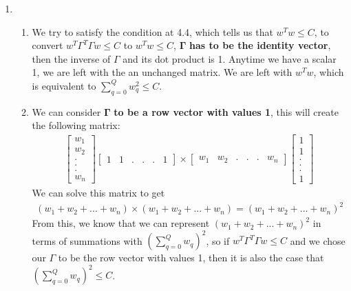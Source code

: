 \documentclass{article}
\begin{document}
\begin{enumerate}
        \item \begin{enumerate}[label=(\alph*)]
            \item We try to satisfy the condition at 4.4, which tells us that $w^Tw \leq C$, to convert $w^T \Gamma^T \Gamma w \leq C$ to $w^Tw \leq C$, $\mathbf{\Gamma}$ \textbf{has to be the identity vector}, then the inverse of $\Gamma$ and its dot product is 1. Anytime we have a scalar 1, we are left with the an unchanged matrix. We are left with $w^Tw$, which is equivalent to $\sum_{q = 0}^{Q} w^2_q \leq C$.
            \item We can consider $\mathbf{\Gamma}$ \textbf{to be a row vector with values 1}, this will create the following matrix:
            \begin{align*}
                \begin{bmatrix}
                    w_1 \\
                    w_2 \\
                    .\\
                    .\\
                    .\\
                    w_n
                \end{bmatrix}
                \begin{bmatrix}
                    1 & 1 & . & . & . & 1
                \end{bmatrix}
                \times
                \begin{bmatrix}
                    w_1 & w_2 & . & . & . & w_n
                \end{bmatrix}
                \begin{bmatrix}
                    1 \\
                    1 \\
                    . \\
                    . \\
                    . \\
                    1
                \end{bmatrix}
            \end{align*}
            We can solve this matrix to get
            \begin{align*}
                (w_1 + w_2 + ... + w_n) \times (w_1 + w_2 + ... + w_n) = (w_1 + w_2 + ... + w_n)^2
            \end{align*}
            From this, we know that we can represent $(w_1 + w_2 + ... + w_n)^2$ in terms of summations with $(\sum_{q = 0}^{Q} w_q)^2$, so if $w^T \Gamma ^T \Gamma w \leq C$ and we chose our $\Gamma$ to be the row vector with values 1, then it is also the case that $(\sum_{q = 0}^{Q} w_q)^2 \leq C$.
        \end{enumerate}


\end{enumerate}
\end{document}
